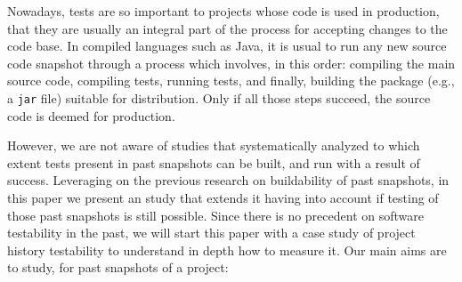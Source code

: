 
Nowadays, tests are so important to projects whose code is used in production, that they are usually an integral part of the process for accepting changes to the code base. In compiled languages such as Java, it is usual to run any new source code snapshot through a process which involves, in this order: compiling the main source code, compiling tests, running tests, and finally, building the package (e.g., a \texttt{jar} file) suitable for distribution. Only if all those steps succeed, the source code is deemed for production.



However, we are not aware of studies that systematically analyzed to which extent tests present in past snapshots can be built, and run with a result of success. Leveraging on the previous research on buildability of past snapshots, in this paper we present an study that extends it having into account if testing of those past snapshots is still possible. 
Since there is no precedent on software testability in the past, we will start this paper with a case study of project history testability to understand in depth how to measure it.
Our main aims are to study, for past snapshots of a project:



